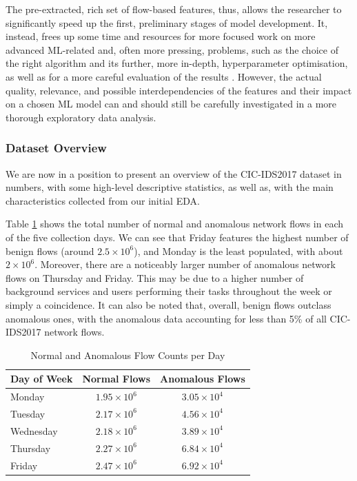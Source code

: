The pre-extracted, rich set of flow-based features, thus, allows the researcher to significantly speed up the first, preliminary stages of model development. It, instead, frees up some time and resources for more focused work on more advanced ML-related and, often more pressing, problems, such as the choice of the right algorithm and its further, more in-depth, hyperparameter optimisation, as well as for a more careful evaluation of the results \parencite {shafi2022comprehensive}. However, the actual quality, relevance, and possible interdependencies of the features and their impact on a chosen ML model can and should still be carefully investigated in a more thorough exploratory data analysis.

\subsubsection{Dataset Overview} 
We are now in a position to present an overview of the CIC-IDS2017 dataset in numbers, with some high-level descriptive statistics, as well as, with the main characteristics collected from our initial EDA.

Table \ref{tab:flow_counts} shows the total number of normal and anomalous network flows in each of the five collection days. We can see that Friday features the highest number of benign flows (around $2.5\times10^6$), and Monday is the least populated, with about $2\times10^6$. Moreover, there are a noticeably larger number of anomalous network flows on Thursday and Friday. This may be due to a higher number of background services and users performing their tasks throughout the week or simply a coincidence. It can also be noted that, overall, benign flows outclass anomalous ones, with the anomalous data accounting for less than 5\% of all CIC-IDS2017 network flows.

\begin{table}[h] 
\centering 
\caption{Normal and Anomalous Flow Counts per Day} 
\label{tab:flow_counts} 
\begin{tabular}{lcc} 
\toprule 
Day of Week & Normal Flows & Anomalous Flows \\ 
\midrule 
Monday & $1.95\times10^6$ & $3.05\times10^4$ \\ 
Tuesday & $2.17\times10^6$ & $4.56\times10^4$ \\ 
Wednesday & $2.18\times10^6$ & $3.89\times10^4$ \\ 
Thursday & $2.27\times10^6$ & $6.84\times10^4$ \\ 
Friday & $2.47\times10^6$ & $6.92\times10^4$ \\ 
\bottomrule 
\end{tabular} 
\end{table} 

